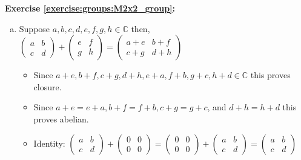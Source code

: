 \noindent\textbf{Exercise \ref{exercise:groups:M2x2_group}:}
%
\begin{enumerate}[(a)]
\item
Suppose $a, b, c, d, e, f, g, h \in {\mathbb C}$ then, $
\begin{pmatrix}
a & b \\
c & d
\end{pmatrix} + 
\begin{pmatrix}
e & f \\
g & h
\end{pmatrix} = \begin{pmatrix}
a + e & b + f \\
c + g & d + h
\end{pmatrix}$

	\begin{itemize}
	\item
	Since $a + e, b + f, c + g, d + h, e + a, f + b, g + c, h + d \in {\mathbb C}$ this proves closure.
	
	\item
	Since $a + e =  e + a, b + f = f + b, c + g = g + c$, and $d + h = h + d$ this proves abelian.

	\item
	Identity:
	$
	\begin{pmatrix}
	a & b \\
	c & d
	\end{pmatrix} + 
	\begin{pmatrix}
	0 & 0 \\
	0 & 0
	\end{pmatrix} = \begin{pmatrix}
	0 & 0 \\
	0 & 0
	\end{pmatrix}+ 
	\begin{pmatrix}
	a & b \\
	c & d
	\end{pmatrix}  = \begin{pmatrix}
	a & b \\
	c & d
	\end{pmatrix}$
	

\end{itemize}
\end{enumerate}
